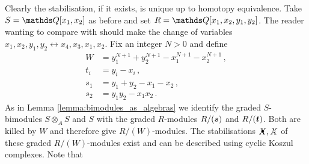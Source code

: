 \documentclass{compositio}
\theoremstyle{definition}
\numberwithin{equation}{section}
\begin{document}
Clearly the stabilisation, if it exists, is unique up to homotopy equivalence. Take $S = \QQ[x_1,x_2]$ as before and set $R = \QQ[x_1,x_2,y_1,y_2]$. The reader wanting to compare with \cite[Section 6]{kr0401268} should make the change of variables $x_1,x_2,y_1,y_2 \leftrightarrow x_4,x_3,x_1,x_2$. Fix an integer $N > 0$ and define
\begin{align*}
W &= y_1^{N+1} + y_2^{N+1} - x_1^{N+1} - x_2^{N+1}\,,\\
t_i &= y_i - x_i\,,\\
s_1 &= y_1 + y_2 - x_1 - x_2\,,\\
s_2 &= y_1 y_2 - x_1 x_2\,.
\end{align*}
As in Lemma \ref{lemma:bimodules_as_algebras} we identify the graded $S$-bimodules $S \otimes_A S$ and $S$ with the graded $R$-modules $R/(\boldsymbol{s})$ and $R/(\boldsymbol{t})$. Both are killed by $W$ and therefore give $R/(W)$-modules. The stabilisations $\Xbul, \Xcirc$ of these graded $R/(W)$-modules exist and can be described using cyclic Koszul complexes. Note that
\end{document}
